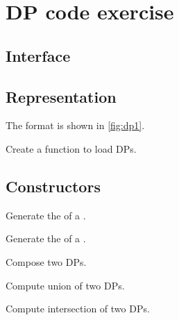 \section{DP code exercise}

\label{sec:exercises-DP}

\subsection*{Interface}

\subsection*{Representation}

The format is shown in \cref{fig:dp1}.


\begin{codeexercise}
    Create a function to load DPs.
\end{codeexercise}

\subsection*{Constructors}

\begin{codeexercise}
    Generate the  of a .
\end{codeexercise}

\begin{codeexercise}
    Generate the  of a .
\end{codeexercise}

\begin{codeexercise}
    Compose two DPs.
\end{codeexercise}

\begin{codeexercise}
    Compute union of two DPs.
\end{codeexercise}

\begin{codeexercise}
    Compute intersection of two DPs.
\end{codeexercise}
